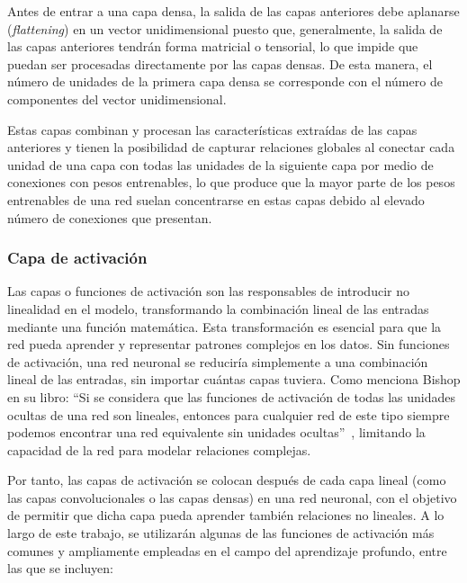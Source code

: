 Antes de entrar a una capa densa, la salida de las capas anteriores debe aplanarse (\emph{flattening}) en un vector unidimensional puesto que, generalmente, la salida de las capas anteriores tendrán forma matricial o tensorial, lo que impide que puedan ser procesadas directamente por las capas densas. De esta manera, el número de unidades de la primera capa densa se corresponde con el número de componentes del vector unidimensional.\newline

Estas capas combinan y procesan las características extraídas de las capas anteriores y tienen la posibilidad de capturar relaciones globales al conectar cada unidad de una capa con todas las unidades de la siguiente capa por medio de conexiones con pesos entrenables, lo que produce que la mayor parte de los pesos entrenables de una red suelan concentrarse en estas capas debido al elevado número de conexiones que presentan.\newline

\subsubsection{Capa de activación}\label{subsubsec:capa-de-activacion}

Las capas o funciones de activación son las responsables de introducir no linealidad en el modelo, transformando la combinación lineal de las entradas mediante una función matemática. Esta transformación es esencial para que la red pueda aprender y representar patrones complejos en los datos. Sin funciones de activación, una red neuronal se reduciría simplemente a una combinación lineal de las entradas, sin importar cuántas capas tuviera. Como menciona Bishop en su libro: ``Si se considera que las funciones de activación de todas las unidades ocultas de una red son lineales, entonces para cualquier red de este tipo siempre podemos encontrar una red equivalente sin unidades ocultas''~\cite{Bishop2006}, limitando la capacidad de la red para modelar relaciones complejas.\newline

Por tanto, las capas de activación se colocan después de cada capa lineal (como las capas convolucionales o las capas densas) en una red neuronal, con el objetivo de permitir que dicha capa pueda aprender también relaciones no lineales. A lo largo de este trabajo, se utilizarán algunas de las funciones de activación más comunes y ampliamente empleadas en el campo del aprendizaje profundo, entre las que se incluyen:

